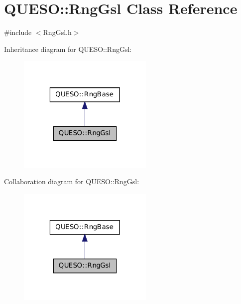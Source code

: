 \hypertarget{class_q_u_e_s_o_1_1_rng_gsl}{\section{Q\-U\-E\-S\-O\-:\-:Rng\-Gsl Class Reference}
\label{class_q_u_e_s_o_1_1_rng_gsl}
}


{\ttfamily \#include $<$Rng\-Gsl.\-h$>$}



Inheritance diagram for Q\-U\-E\-S\-O\-:\-:Rng\-Gsl\-:
\nopagebreak
\begin{figure}[H]
\begin{center}
\leavevmode
\includegraphics[width=184pt]{class_q_u_e_s_o_1_1_rng_gsl__inherit__graph}
\end{center}
\end{figure}


Collaboration diagram for Q\-U\-E\-S\-O\-:\-:Rng\-Gsl\-:
\nopagebreak
\begin{figure}[H]
\begin{center}
\leavevmode
\includegraphics[width=184pt]{class_q_u_e_s_o_1_1_rng_gsl__coll__graph}
\end{center}
\end{figure}
